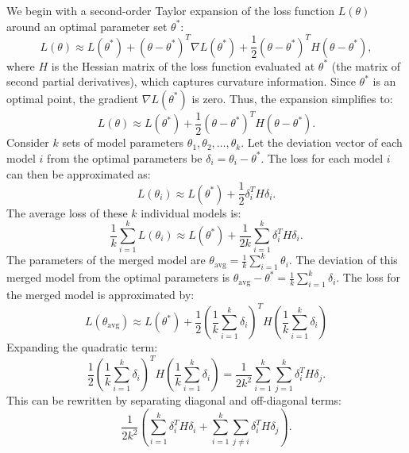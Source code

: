 We begin with a second-order Taylor expansion of the loss function \(L(\theta)\) around an optimal parameter set \(\theta^*\):
\begin{equation}
L(\theta) \approx L(\theta^*) + (\theta - \theta^*)^T \nabla L(\theta^*) + \frac{1}{2}(\theta - \theta^*)^T H (\theta - \theta^*),
\end{equation}
where \(H\) is the Hessian matrix of the loss function evaluated at \(\theta^*\) (the matrix of second partial derivatives), which captures curvature information. Since \(\theta^*\) is an optimal point, the gradient \(\nabla L(\theta^*)\) is zero. Thus, the expansion simplifies to:
\begin{equation}
L(\theta) \approx L(\theta^*) + \frac{1}{2}(\theta - \theta^*)^T H (\theta - \theta^*).
\end{equation}
Consider \(k\) sets of model parameters \(\theta_1, \theta_2, \ldots, \theta_k\). Let the deviation vector of each model \(i\) from the optimal parameters be \(\delta_i = \theta_i - \theta^*\). The loss for each model \(i\) can then be approximated as:
\begin{equation}
L(\theta_i) \approx L(\theta^*) + \frac{1}{2}\delta_i^T H \delta_i .
\end{equation}
The average loss of these \(k\) individual models is:
\begin{equation}
\frac{1}{k}\sum_{i=1}^k L(\theta_i) \approx L(\theta^*) + \frac{1}{2k}\sum_{i=1}^k \delta_i^T H \delta_i .
\end{equation}
The parameters of the merged model are \(\theta_{\text{avg}} = \frac{1}{k}\sum_{i=1}^k \theta_i\). The deviation of this merged model from the optimal parameters is \(\theta_{\text{avg}} - \theta^* = \frac{1}{k}\sum_{i=1}^k \delta_i\).
The loss for the merged model is approximated by:
\begin{equation}
L(\theta_{\text{avg}}) \approx L(\theta^*) + \frac{1}{2}\left(\frac{1}{k}\sum_{i=1}^k \delta_i\right)^T H \left(\frac{1}{k}\sum_{i=1}^k \delta_i\right)
\end{equation}
Expanding the quadratic term:
\begin{equation}
\frac{1}{2}\left(\frac{1}{k}\sum_{i=1}^k \delta_i\right)^T H \left(\frac{1}{k}\sum_{i=1}^k \delta_i\right) = \frac{1}{2k^2}\sum_{i=1}^k\sum_{j=1}^k \delta_i^T H \delta_j .
\end{equation}
This can be rewritten by separating diagonal and off-diagonal terms:
\begin{equation}
\frac{1}{2k^2}\left(\sum_{i=1}^k \delta_i^T H \delta_i + \sum_{i=1}^k\sum_{j\neq i} \delta_i^T H \delta_j\right).
\end{equation}
